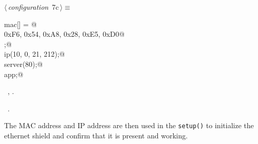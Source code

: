 \documentclass[a4paper, 11pt]{article}
\begin{document}
\begin{flushleft} \small
\begin{minipage}{\linewidth}\label{scrap8}\raggedright\small
{}$\langle\,${\itshape configuration}\nobreak\ {\footnotesize{7c}}$\,\rangle\equiv$
\vspace{-1ex}
\begin{list}{}{\setlength{\leftmargin}{1em}} \item
\mbox{}\lstinline@byte mac[] = {@\\
\mbox{}\lstinline@  0xF6, 0x54, 0xA8, 0x28, 0xE5, 0xD0@\\
\mbox{}\lstinline@};@\\
\mbox{}\lstinline@IPAddress ip(10, 0, 21, 212);@\\
\mbox{}\lstinline@EthernetServer server(80);@\\
\mbox{}\lstinline@Application app;@\\
\mbox{}{\NWsep}
\end{list}
\vspace{-1ex}
\vspace{-1ex}
\footnotesize
\begin{list}{}{\setlength{\itemsep}{-\parsep}\setlength{\itemindent}{-\leftmargin}}
\item \NWtxtMacroDefBy\ , .
\item \NWtxtMacroRefIn\ .
\end{list}
\end{minipage}
\end{flushleft}

The MAC address and IP address are then used in the \verb|setup()|
to initialize the ethernet shield
and confirm that it is present and working.
\end{document}
